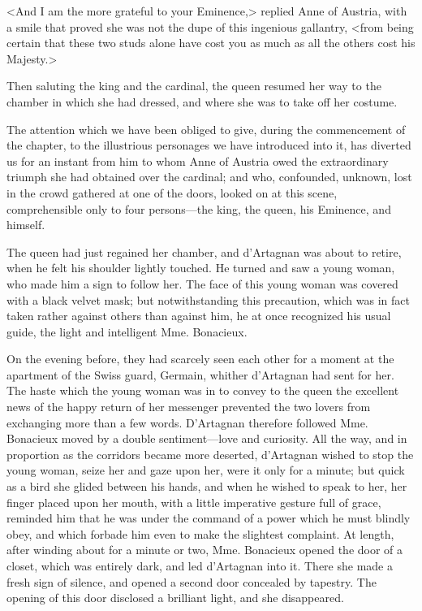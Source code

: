 <And I am the more grateful to your Eminence,> replied Anne of Austria, with a smile that proved she was not the dupe of this ingenious gallantry, <from being certain that these two studs alone have cost you as much as all the others cost his Majesty.> 

Then saluting the king and the cardinal, the queen resumed her way to the chamber in which she had dressed, and where she was to take off her costume. 

The attention which we have been obliged to give, during the commencement of the chapter, to the illustrious personages we have introduced into it, has diverted us for an instant from him to whom Anne of Austria owed the extraordinary triumph she had obtained over the cardinal; and who, confounded, unknown, lost in the crowd gathered at one of the doors, looked on at this scene, comprehensible only to four persons---the king, the queen, his Eminence, and himself. 

The queen had just regained her chamber, and d'Artagnan was about to retire, when he felt his shoulder lightly touched. He turned and saw a young woman, who made him a sign to follow her. The face of this young woman was covered with a black velvet mask; but notwithstanding this precaution, which was in fact taken rather against others than against him, he at once recognized his usual guide, the light and intelligent Mme. Bonacieux. 

On the evening before, they had scarcely seen each other for a moment at the apartment of the Swiss guard, Germain, whither d'Artagnan had sent for her. The haste which the young woman was in to convey to the queen the excellent news of the happy return of her messenger prevented the two lovers from exchanging more than a few words. D'Artagnan therefore followed Mme. Bonacieux moved by a double sentiment---love and curiosity. All the way, and in proportion as the corridors became more deserted, d'Artagnan wished to stop the young woman, seize her and gaze upon her, were it only for a minute; but quick as a bird she glided between his hands, and when he wished to speak to her, her finger placed upon her mouth, with a little imperative gesture full of grace, reminded him that he was under the command of a power which he must blindly obey, and which forbade him even to make the slightest complaint. At length, after winding about for a minute or two, Mme. Bonacieux opened the door of a closet, which was entirely dark, and led d'Artagnan into it. There she made a fresh sign of silence, and opened a second door concealed by tapestry. The opening of this door disclosed a brilliant light, and she disappeared. 

